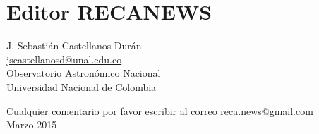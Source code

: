 \documentclass{book}
\begin{document}
			\section*{Editor RECANEWS}
  
\begin{flushright}
J. Sebastián Castellanos-Durán\\
\url{jscastellanosd@unal.edu.co}\\
Observatorio Astronómico Nacional\\
Universidad Nacional de Colombia
\end{flushright}
\begin{flushright}
Cualquier comentario por favor escribir al correo  \url{reca.news@gmail.com}\\
Marzo 2015
\end{flushright}
\end{document}
